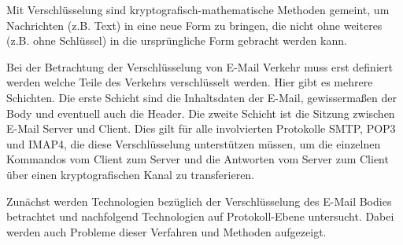 Mit Verschlüsselung sind kryptografisch-mathematische Methoden gemeint, um Nachrichten (z.B. Text) in eine neue Form zu bringen, die nicht ohne weiteres (z.B. ohne Schlüssel) in die ursprüngliche Form gebracht werden kann.

Bei der Betrachtung der Verschlüsselung von E-Mail Verkehr muss erst definiert werden welche Teile des Verkehrs verschlüsselt werden. Hier gibt es mehrere Schichten. Die erste Schicht sind die Inhaltsdaten der E-Mail, gewissermaßen der Body und eventuell auch die Header. Die zweite Schicht ist die Sitzung zwischen E-Mail Server und Client. Dies gilt für alle involvierten Protokolle SMTP, POP3 und IMAP4, die diese Verschlüsselung unterstützen müssen, um die einzelnen Kommandos vom Client zum Server und die Antworten vom Server zum Client über einen kryptografischen Kanal zu transferieren.

Zunächst werden Technologien bezüglich der Verschlüsselung des E-Mail Bodies betrachtet und nachfolgend Technologien auf Protokoll-Ebene untersucht. Dabei werden auch Probleme dieser Verfahren und Methoden aufgezeigt.
